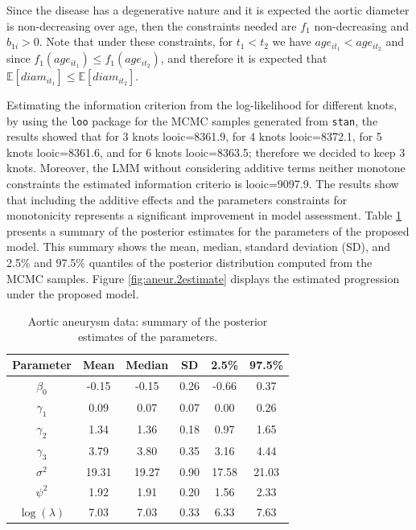 \documentclass[11pt,letterpaper]{article}
\begin{document}
Since the disease has a degenerative nature and it is expected the aortic diameter is non-decreasing over age, then the constraints needed are  $f_1$ non-decreasing and $b_{1i}>0$. 
Note that under these constraints, for $t_1<t_2$ we have $age_{it_1}<age_{it_2}$  and 
since  $f_1(age_{it_1})\leq f_1(age_{it_2})$, and therefore it is expected that $\mathbb{E}\left[{diam}_{it_1}\right] \leq \mathbb{E}\left[{diam}_{it_2}\right]$. 


Estimating the information criterion from the  log-likelihood for different knots, by using the \texttt{loo} package for the MCMC samples generated from \texttt{stan}, the results showed that 
for 3 knots looic=8361.9, 
for 4 knots looic=8372.1, 
for 5 knots looic=8361.6, and 
for 6 knots looic=8363.5;  therefore we decided to keep 3 knots. 
Moreover, the LMM without considering additive terms neither monotone constraints the estimated information criterio is looic=9097.9.  
The results show that including the additive effects and the parameters constraints for monotonicity  represents a significant improvement in model assessment. 
Table \ref{tab:aneur.2estimate} presents a summary of the posterior estimates for the parameters of the proposed model.  This summary shows the mean, median, standard deviation (SD), and 2.5\% and 97.5\% quantiles of the posterior distribution computed from the MCMC samples. 
Figure \ref{fig:aneur.2estimate} displays the estimated progression under the proposed model. 



\begin{table}[!htb] 
\centering 
\caption{Aortic aneurysm data: summary of the posterior estimates of the parameters. }\label{tab:aneur.2estimate} 
\begin{tabular}{cccccc} 
\hline 
\textbf{Parameter} & \textbf{Mean} & \textbf{Median} & \textbf{SD} & \textbf{2.5\%} & \textbf{97.5\%} \\ 
\hline 
$\beta_0$ & 
-0.15 & -0.15 & 0.26 & -0.66 & 0.37 \\ 
$\gamma_1$ & 
0.09 & 0.07 & 0.07 & 0.00 & 0.26 \\ 
$\gamma_2$ & 
1.34 & 1.36 & 0.18 & 0.97 & 1.65 \\ 
$\gamma_3$ & 
3.79 & 3.80 & 0.35 & 3.16 & 4.44 \\ 
$\sigma^2$ & 
19.31 & 19.27 & 0.90 & 17.58 & 21.03 \\ 
$\psi^2$ & 
1.92 & 1.91  & 0.20 & 1.56 & 2.33 \\ 
$\log(\lambda)$ & 
7.03 & 7.03 & 0.33 & 6.33 & 7.63 \\
\hline 
\end{tabular} 
\end{table} 
\end{document}
